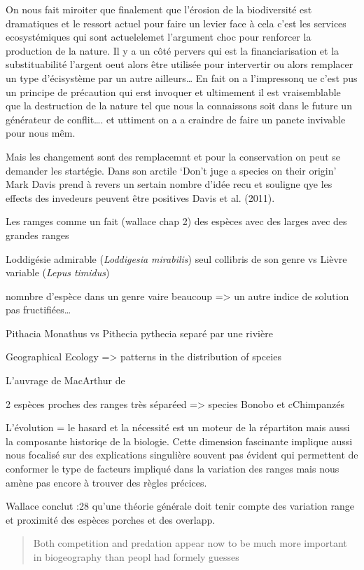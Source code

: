 On nous fait miroiter que finalement que l'érosion de la biodiversité
est dramatiques et le ressort actuel pour faire un levier face à cela
c'est les services ecosystémiques qui sont actuelelemet l'argument choc
pour renforcer la production de la nature. Il y a un côté pervers qui
est la financiarisation et la substituabilité l'argent oeut alors être
utilisée pour intervertir ou alors remplacer un type d'écisystème par un
autre ailleurs\ldots{} En fait on a l'impressonq ue c'est pus un
principe de précaution qui erst invoquer et ultimement il est
vraisemblable que la destruction de la nature tel que nous la
connaissons soit dans le future un générateur de conflit\ldots{}. et
uttiment on a a craindre de faire un panete invivable pour nous mêm.

Mais les changement sont des remplacemnt et pour la conservation on peut
se demander les startégie. Dans son arctile `Don't juge a species on
their origin' Mark Davis prend à revers un sertain nombre d'idée recu et
souligne qye les effects des invedeurs peuvent être positives Davis et
al. (2011).

Les ramges comme un fait (wallace chap 2) des espèces avec des larges
avec des grandes ranges

Loddigésie admirable (\emph{Loddigesia mirabilis}) seul collibris de son
genre vs Lièvre variable (\emph{Lepus timidus})

nomnbre d'espèce dans un genre vaire beaucoup =\textgreater{} un autre
indice de solution pas fructifiées\ldots{}

Pithacia Monathus vs Pithecia pythecia separé par une rivière

Geographical Ecology =\textgreater{} patterns in the distribution of
spceies

L'auvrage de MacArthur de

2 espèces proches des ranges très séparéed =\textgreater{} species
Bonobo et cChimpanzés

L'évolution = le hasard et la nécessité est un moteur de la répartiton
mais aussi la composante historiqe de la biologie. Cette dimension
fascinante implique aussi nous focalisé sur des explications singulière
souvent pas évident qui permettent de conformer le type de facteurs
impliqué dans la variation des ranges mais nous amène pas encore à
trouver des règles précices.

Wallace conclut :28 qu'une théorie générale doit tenir compte des
variation range et proximité des espèces porches et des overlapp.

\begin{quote}
Both competition and predation appear now to be much more important in
biogeography than peopl had formely guesses
\end{quote}

